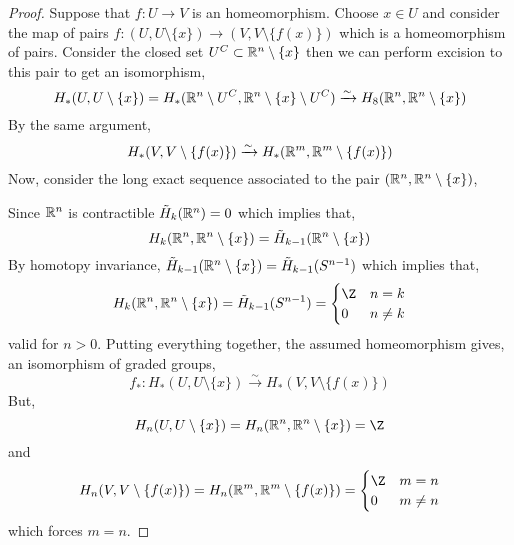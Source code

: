 \documentclass[12pt]{extarticle}
\begin{document}
\begin{proof}
Suppose that $f : U \to V$ is an homeomorphism. Choose $x \in U$ and consider the map of pairs $f : (U, U \setminus \{x \}) \to (V, V \setminus \{ f(x) \})$ which is a homeomorphism of pairs. Consider the closed set $U^C \subset \mathbb{R}^n \setminus \{ x \}$ then we can perform excision to this pair to get an isomorphism,
\[ H_*(U, U \setminus \{x \}) = H_*(\mathbb{R}^n \setminus U^C, \mathbb{R}^n \setminus \{ x \} \setminus U^C)  \xrightarrow{\sim} H_8(\mathbb{R}^n, \mathbb{R}^n \setminus \{ x \}) \]
By the same argument,
\[ H_*(V, V \setminus \{ f(x) \}) \xrightarrow{\sim} H_*(\mathbb{R}^m, \mathbb{R}^m \setminus \{ f(x) \}) \]
Now, consider the long exact sequence associated to the pair $(\mathbb{R}^n, \mathbb{R}^n \setminus \{ x \})$,
\begin{center}
\end{center}
Since $\mathbb{R}^n$ is contractible $\tilde{H}_k(\mathbb{R}^n) = 0$ which implies that,
\[ H_k(\mathbb{R}^n, \mathbb{R}^n \setminus \{ x \}) = \tilde{H}_{k-1}(\mathbb{R}^n \setminus \{ x \}) \]
By homotopy invariance, $\tilde{H}_{k-1}(\mathbb{R}^n \setminus \{ x \}) = \tilde{H}_{k - 1}(S^{n-1})$ which implies that,
\[ H_k(\R^n, \R^n \setminus \{ x \}) = \tilde{H}_{k-1}(S^{n-1}) = \begin{cases}
\Z & n = k
\\
0 & n \neq k 
\end{cases} \]
valid for $n > 0$. Putting everything together, the assumed homeomorphism gives, an isomorphism of graded groups,
\[ f_* : H_*(U, U \setminus \{ x \}) \xrightarrow{\sim}  H_*(V, V \setminus \{ f(x) \}) \]
But, 
\[ H_n(U, U \setminus \{ x \}) = H_n(\R^n, \R^n \setminus \{ x \}) = \Z \]
and 
\[ H_n(V, V \setminus \{ f(x) \}) = H_n(\R^m, \R^m \setminus \{ f(x) \}) = \begin{cases}
\Z & m = n
\\
0 & m \neq n 
\end{cases} \]
which forces $m = n$. 
\end{proof}
\end{document}
